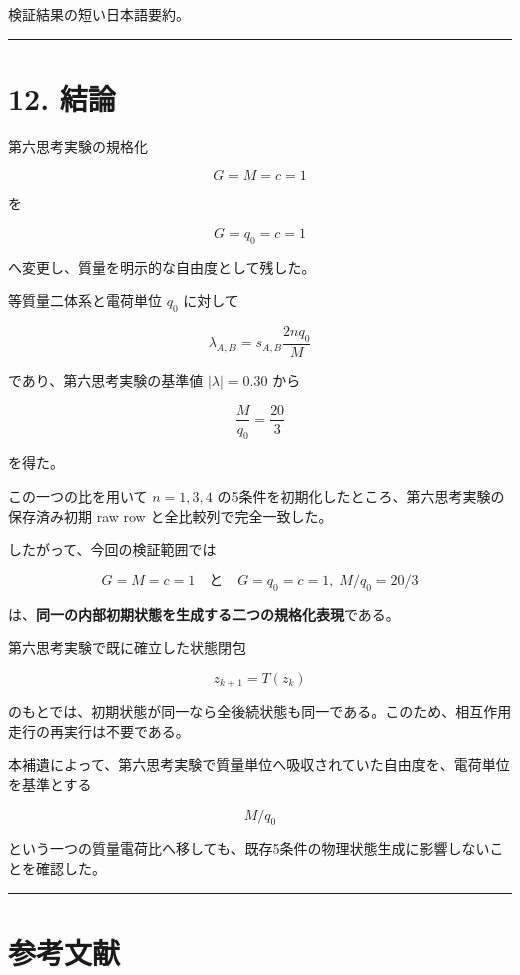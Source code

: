 \documentclass[
  a4paper,
]{ltjsarticle}
\begin{document}
検証結果の短い日本語要約。

\begin{center}\rule{0.5\linewidth}{0.5pt}\end{center}

\section{12. 結論}\label{ux7d50ux8ad6}

第六思考実験の規格化

\[
G=M=c=1
\]

を

\[
G=q_0=c=1
\]

へ変更し、質量を明示的な自由度として残した。

等質量二体系と電荷単位 \(q_0\) に対して

\[
\lambda_{A,B}=s_{A,B}\frac{2nq_0}{M}
\]

であり、第六思考実験の基準値 \(|\lambda|=0.30\) から

\[
\boxed{\frac{M}{q_0}=\frac{20}{3}}
\]

を得た。

この一つの比を用いて \(n=1,3,4\)
の5条件を初期化したところ、第六思考実験の保存済み初期 raw row
と全比較列で完全一致した。

したがって、今回の検証範囲では

\[
\boxed{
G=M=c=1
\quad\text{と}\quad
G=q_0=c=1,\;M/q_0=20/3
}
\]

は、\textbf{同一の内部初期状態を生成する二つの規格化表現}である。

第六思考実験で既に確立した状態閉包

\[
z_{k+1}=T(z_k)
\]

のもとでは、初期状態が同一なら全後続状態も同一である。このため、相互作用走行の再実行は不要である。

本補遺によって、第六思考実験で質量単位へ吸収されていた自由度を、電荷単位を基準とする

\[
\boxed{M/q_0}
\]

という一つの質量電荷比へ移しても、既存5条件の物理状態生成に影響しないことを確認した。

\begin{center}\rule{0.5\linewidth}{0.5pt}\end{center}

\section{参考文献}\label{ux53c2ux8003ux6587ux732e}
\end{document}
